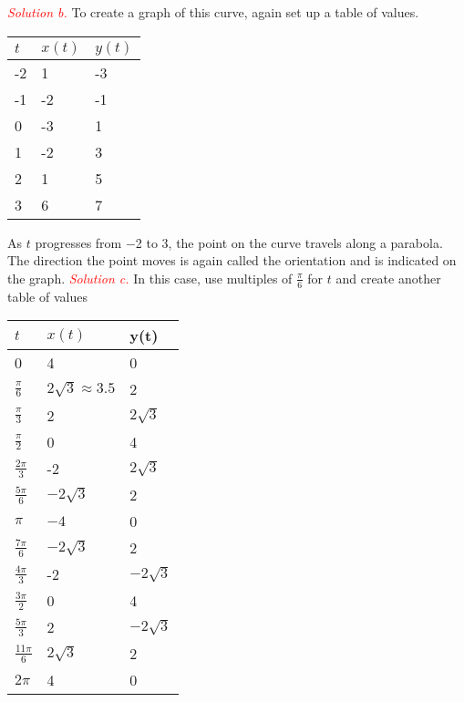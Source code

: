 \documentclass{report}
\begin{document}
    \hspace{.1in}
    \begin{minipage}[]{0.47\textwidth}
    \end{minipage}
    \pagebreak \bigbreak \noindent 
    \textcolor{red}{\textit{Solution b.}}
    To create a graph of this curve, again set up a table of values.
    \bigbreak \noindent 
    \begin{tabularx}{\textwidth}{|X|X|X|}
        \hline
        $t$ & $x(t)$ & $y(t)$ \\
        \hline
        -2 & 1 & -3 \\
        -1 &-2 & -1 \\
        0 & -3  & 1 \\
        1 & -2 & 3 \\
        2 & 1 & 5 \\
        3 & 6 & 7  \\
        \hline
    \end{tabularx}
    \bigbreak \noindent 
    As $t$ progresses from −2 to 3, the point on the curve travels along a parabola. The direction the point moves is again called the orientation and is indicated on the graph.
    \bigbreak \noindent 
    \bigbreak \noindent 
    \textcolor{red}{\textit{Solution c.}}
    In this case, use multiples of  $\frac{\pi}{6}$ for $t$ and create another table of values
    \bigbreak \noindent 
    \begin{minipage}[]{0.47\textwidth}
        \begin{tabularx}{\textwidth}{|X|X|X|}
            \hline
            $t$ & $x(t)$ & y(t) \\
            \hline
            0 & 4 &0 \\
            $\frac{\pi}{6}$ & $2\sqrt{3} \approx 3.5 $ & 2 \\
            $\frac{\pi}{3}$ & 2 & $2\sqrt{3}$ \\
            $\frac{\pi}{2}$ & 0 & 4 \\
            $\frac{2\pi}{3}$ & -2 & $2\sqrt{3}$ \\
            $\frac{5\pi}{6}$ & $-2\sqrt{3} $ & 2 \\
            $\pi$ & $-4$ & 0 \\
            $\frac{7\pi}{6}$ & $-2\sqrt{3} $ & 2 \\
            $\frac{4\pi}{3}$   & -2 & $-2\sqrt{3} $ \\
            $\frac{3\pi}{2}$  & 0 & 4 \\
            $\frac{5\pi}{3}$  & 2 & $-2\sqrt{3} $ \\
            $\frac{11\pi}{6}$ & $2\sqrt{3}$ & 2\\
            $2\pi$ & 4 & 0  \\
            \hline
        \end{tabularx}
    \end{minipage}
    \hspace{.1in}
    \begin{minipage}[]{0.47\textwidth}
    \end{minipage}
\end{document}
